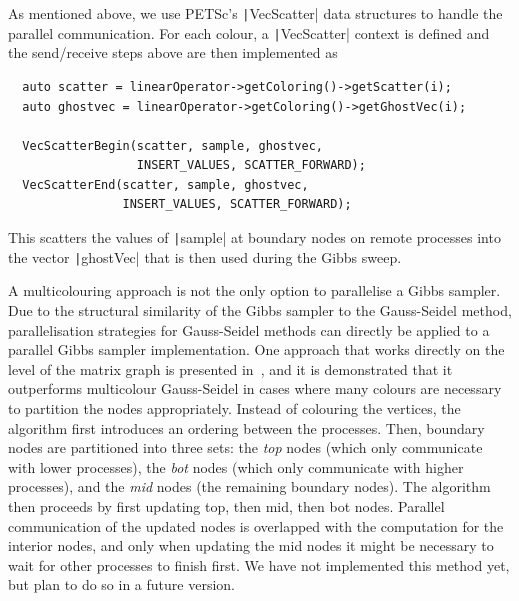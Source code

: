 \documentclass[
fontsize=11pt,
paper=a4,
numbers=noenddot
]{scrartcl}
\begin{document}
As mentioned above, we use PETSc's \texttt|VecScatter| data structures to handle the parallel communication. For each colour, a \texttt|VecScatter| context is defined and the send/receive steps above are then implemented as
\begin{verbatim}
  auto scatter = linearOperator->getColoring()->getScatter(i);
  auto ghostvec = linearOperator->getColoring()->getGhostVec(i);

  VecScatterBegin(scatter, sample, ghostvec, 
                  INSERT_VALUES, SCATTER_FORWARD);
  VecScatterEnd(scatter, sample, ghostvec, 
                INSERT_VALUES, SCATTER_FORWARD);
\end{verbatim}
This scatters the values of \texttt|sample| at boundary nodes on remote processes into the vector \texttt|ghostVec| that is then used during the Gibbs sweep. 

A multicolouring approach is not the only option to parallelise a Gibbs sampler. Due to the structural similarity of the Gibbs sampler to the Gauss-Seidel method, parallelisation strategies for Gauss-Seidel methods can directly be applied to a parallel Gibbs sampler implementation. One approach that works directly on the level of the matrix graph is presented in~\cite{adams2001}, and it is demonstrated that it outperforms multicolour Gauss-Seidel in cases where many colours are necessary to partition the nodes appropriately. Instead of colouring the vertices, the algorithm first introduces an ordering between the processes. Then, boundary nodes are partitioned into three sets: the \emph{top} nodes (which only communicate with lower processes), the \emph{bot} nodes (which only communicate with higher processes), and the \emph{mid} nodes (the remaining boundary nodes). The algorithm then proceeds by first updating top, then mid, then bot nodes. Parallel communication of the updated nodes is overlapped with the computation for the interior nodes, and only when updating the mid nodes it might be necessary to wait for other processes to finish first. We have not implemented this method yet, but plan to do so in a future version.
\end{document}
